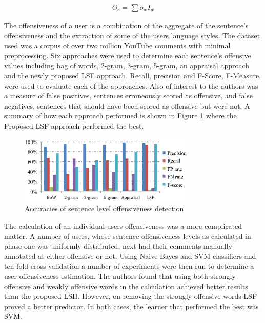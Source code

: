 \begin{align}
	{O}_{{s}}={\sum {{o}_{{w}}{I}_{{w}}}}
\end{align}

The offensiveness of a user is a combination of the aggregate of the sentence's offensiveness and the extraction of some of the users language styles. The dataset used was a corpus of over two million YouTube comments with minimal preprocessing. Six approaches were used to determine each sentence's offensive values including bag of words, 2-gram, 3-gram, 5-gram, an appraisal approach \cite{whitelaw_using_2005} and the newly proposed LSF approach. Recall, precision and F-Score, F-Measure, were used to evaluate each of the approaches. Also of interest to the authors was a measure of false positives, sentences erroneously scored as offensive, and false negatives, sentences that should have been scored as offensive but were not. A summary of how each approach performed is shown in Figure \ref{fig:chen_detecting_2012_01} where the Proposed LSF approach performed the best.

\begin{figure}[htbp]
	\centering
	\includegraphics[width=0.75\textwidth]{Figures/Chapter3/chen_detecting_2012_01.jpg}
	\caption[Accuracies of sentence level offensiveness detection]{Accuracies of sentence level offensiveness detection \citet{chen_detecting_2012}}
	\label{fig:chen_detecting_2012_01}
\end{figure}

The calculation of an individual users offensiveness was a more complicated matter. A number of users, whose sentence offensiveness levels as calculated in phase one was uniformly distributed, next had their comments manually annotated as either offensive or not. Using Naive Bayes and SVM classifiers and ten-fold cross validation a number of experiments were then run to determine a user offensiveness estimation. The authors found that using both strongly offensive and weakly offensive words in the calculation achieved better results than the proposed LSH. However, on removing the strongly offensive words LSF proved a better predictor. In both cases, the learner that performed the best was SVM.

